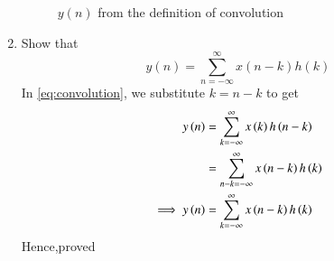 \documentclass[journal,12pt,twocolumn]{IEEEtran}
\theoremstyle{remark}
\begin{document}
\begin{enumerate}[label=\thesection.\arabic*,ref=\thesection.\theenumi]
\begin{figure}[H]
\caption{$y(n)$ from the definition of convolution}
\label{fig:ynconv}
\end{figure}

\item Show that
\begin{equation}
y(n) =  \sum_{n=-\infty}^{\infty}x(n-k)h(k)
\end{equation}
\solution
In \eqref{eq:convolution}, we substitute $k = n - k$ to get
\begin{align}
y\left(n\right) &= \sum_{k=-\infty}^{\infty}x\left(k\right)h\left(n - k\right) \\
		  &= \sum_{n - k=-\infty}^{\infty}x\left(n - k\right)h\left(k\right) \\
		 \implies  y\left(n\right) &= \sum_{k=-\infty}^{\infty}x\left(n - k\right)h\left(k\right)
\end{align}
Hence,proved

\end{enumerate}
\end{document}
